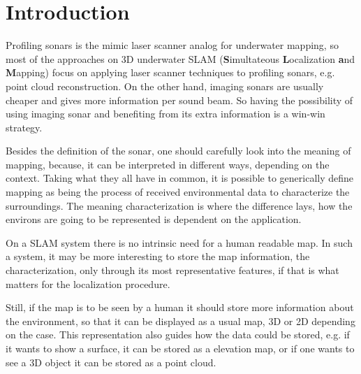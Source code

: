 \chapter{Introduction}
Profiling sonars is the mimic laser scanner analog for underwater mapping,
so most of the approaches on 3D underwater SLAM (\textbf{S}imultateous
\textbf{L}ocalization \textbf{a}nd \textbf{M}apping) focus on applying laser
scanner techniques to profiling sonars, e.g.
point cloud reconstruction. On the other hand, imaging sonars are usually cheaper and gives more information per sound
beam. So having the possibility of using imaging sonar and benefiting from its
extra information is a win-win strategy.

Besides the definition of the sonar, one should carefully look into the meaning
of mapping, because, it can be interpreted in different ways, depending on the
context.
Taking what they all have in common, it is possible to generically define
mapping as being the process of received environmental data to characterize
the surroundings. The meaning characterization is where the
difference lays, how the environs are going to be represented is dependent on
the application.

On a SLAM system there is no intrinsic need for a human readable map. In such a
system, it may be more interesting to store the map information, the
characterization, only through its most representative features, if that is
what matters for the localization procedure.

Still, if the map is to be seen by a human it should store more information
about the environment, so that it can be displayed as a usual map, 3D or 2D
depending on the case. This representation also guides how the data could be
stored, e.g. if it wants to show a surface, it can be stored as a elevation map,
or if one wants to see a 3D object it can be stored as a point cloud.





